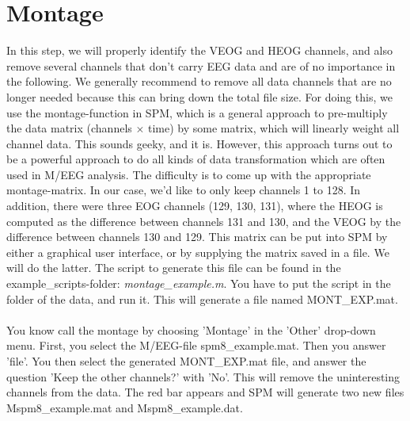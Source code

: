 \section{Montage}
In this step, we will properly identify the VEOG and HEOG channels, and also remove several channels that don't carry EEG data and are of no importance in the following. We generally recommend to remove all data channels that are no longer needed because this can bring down the total file size. For doing this, we use the montage-function in SPM, which is a general approach to pre-multiply the data matrix (channels $\times$ time) by some matrix, which will linearly weight all channel data. This sounds geeky, and it is. However, this approach turns out to be a powerful approach to do all kinds of data transformation which are often used in M/EEG analysis. The difficulty is to come up with the appropriate montage-matrix. In our case, we'd like to only keep channels 1 to 128. In addition, there were three EOG channels (129, 130, 131), where the HEOG is computed as the difference between channels 131 and 130, and the VEOG by the difference between channels 130 and 129. This matrix can be put into SPM by either a graphical user interface, or by supplying the matrix saved in a file. We will do the latter. The script to generate this file can be found in the example\_scripts-folder: \textit{montage\_example.m}. You have to put the script in the folder of the data, and run it. This will generate a file named MONT\_EXP.mat. 
\\
\\
You know call the montage by choosing 'Montage' in the 'Other' drop-down menu. First, you select the M/EEG-file spm8\_example.mat. Then you answer 'file'. You then select the generated MONT\_EXP.mat file, and answer the question 'Keep the other channels?' with 'No'. This will remove the uninteresting channels from the data. The red bar appears and SPM will generate two new files Mspm8\_example.mat and Mspm8\_example.dat.

